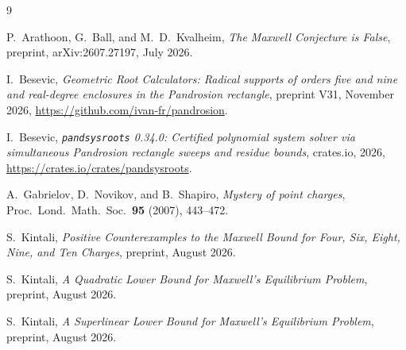 \documentclass[11pt,a4paper]{amsart}
\theoremstyle{definition}
\begin{document}
\begin{thebibliography}{9}

P.~Arathoon, G.~Ball, and M.~D.~Kvalheim,
\emph{The Maxwell Conjecture is False},
preprint, arXiv:2607.27197, July 2026.

I.~Besevic,
\emph{Geometric Root Calculators: Radical supports of orders five and nine and
real-degree enclosures in the Pandrosion rectangle},
preprint V31, November 2026, \url{https://github.com/ivan-fr/pandrosion}.

I.~Besevic,
\emph{\texttt{pandsysroots} 0.34.0: Certified polynomial system solver via
simultaneous Pandrosion rectangle sweeps and residue bounds},
crates.io, 2026, \url{https://crates.io/crates/pandsysroots}.

A.~Gabrielov, D.~Novikov, and B.~Shapiro,
\emph{Mystery of point charges},
Proc.\ Lond.\ Math.\ Soc.\ \textbf{95} (2007), 443--472.

S.~Kintali,
\emph{Positive Counterexamples to the Maxwell Bound for Four, Six, Eight, Nine,
and Ten Charges},
preprint, August 2026.

S.~Kintali,
\emph{A Quadratic Lower Bound for Maxwell's Equilibrium Problem},
preprint, August 2026.

S.~Kintali,
\emph{A Superlinear Lower Bound for Maxwell's Equilibrium Problem},
preprint, August 2026.

\end{thebibliography}
\end{document}

